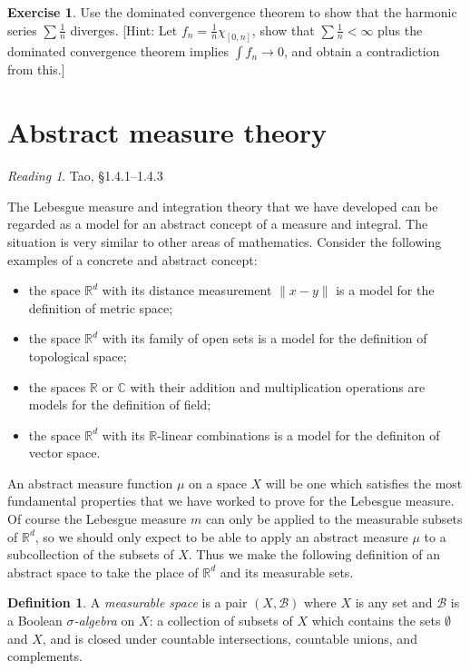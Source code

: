 \documentclass[11pt,oneside]{amsbook}
\newcommand{\RR}{{\mathbb R}}
\newcommand{\CC}{{\mathbb C}}
\theoremstyle{definition}
\newtheorem{exerc}{Exercise}[section]
\theoremstyle{plain}
\theoremstyle{definition}
\newtheorem{defn}[thm]{Definition}
\theoremstyle{remark}
\newtheorem*{reading}{Reading}
\numberwithin{equation}{section}
\numberwithin{figure}{section}
\begin{document}
\begin{exerc}
  Use the dominated convergence theorem to show that the harmonic series $\sum\frac1n$ diverges. [Hint: Let $f_n=\frac1n\chi_{[0,n]}$, show that $\sum\frac1n<\infty$ plus the dominated convergence theorem implies $\int f_n\to 0$, and obtain a contradiction from this.]
\end{exerc}

\newpage
\section{Abstract measure theory}

\begin{reading}
  Tao, \S 1.4.1--1.4.3
\end{reading}

The Lebesgue measure and integration theory that we have developed can be regarded as a model for an abstract concept of a measure and integral. The situation is very similar to other areas of mathematics. Consider the following examples of a concrete and abstract concept:
\begin{itemize}
\item the space $\RR^d$ with its distance measurement $\|x-y\|$ is a model for the definition of metric space;
\item the space $\RR^d$ with its family of open sets is a model for the definition of topological space;
\item the spaces $\RR$ or $\CC$ with their addition and multiplication operations are models for the definition of field;
\item the space $\RR^d$ with its $\RR$-linear combinations is a model for the definiton of vector space.
\end{itemize}

An abstract measure function $\mu$ on a space $X$ will be one which satisfies the most fundamental properties that we have worked to prove for the Lebesgue measure. Of course the Lebesgue measure $m$ can only be applied to the measurable subsets of $\RR^d$, so we should only expect to be able to apply an abstract measure $\mu$ to a subcollection of the subsets of $X$. Thus we make the following definition of an abstract space to take the place of $\RR^d$ and its measurable sets.

\begin{defn}
  A \emph{measurable space} is a pair $(X,\mathcal B)$ where $X$ is any set and $\mathcal B$ is a Boolean \emph{$\sigma$-algebra} on $X$: a collection of subsets of $X$ which contains the sets $\emptyset$ and $X$, and is closed under countable intersections, countable unions, and complements.
\end{defn}
\end{document}
